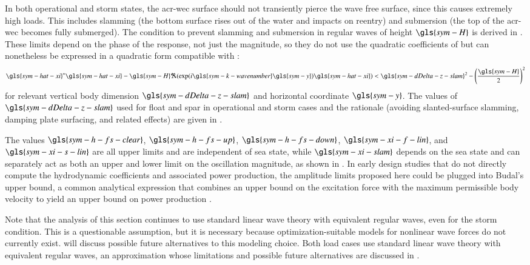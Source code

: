 In both operational and storm states, the \gls{acr-wec} surface should not transiently pierce the wave free surface, since this causes extremely high loads.
This includes slamming (the bottom surface rises out of the water and impacts on reentry) and submersion (the top of the \gls{acr-wec} becomes fully submerged).
The condition to prevent slamming and submersion in regular waves of height $\gls{sym-H}$ is derived in .
These limits depend on the phase of the response, not just the magnitude, so they do not use the quadratic coefficients of  but can nonetheless be expressed in a quadratic form compatible with :
\begin{equation}\label{eq:slam-constraint-quadratic}
    \gls{sym-hat-xi}^*\gls{sym-hat-xi} 
    - \gls{sym-H} \Re(
                    \exp (i\gls{sym-k-wavenumber}\gls{sym-y})
                    \gls{sym-hat-xi}
                    )
    < \gls{sym-dDelta-z-slam}^2
    -\left(
            \frac{\gls{sym-H}}{2}
    \right)^2
\end{equation}
for relevant vertical body dimension $\gls{sym-dDelta-z-slam}$ and horizontal coordinate $\gls{sym-y}$.
The values of $\gls{sym-dDelta-z-slam}$ used for float and spar in operational and storm cases and the rationale
(avoiding slanted-surface slamming, damping plate surfacing, and related effects)
are given in .

\ifdefined\DISSERTATION
    The values $\gls{sym-h-fs-clear}$, $\gls{sym-h-fs-up}$, $\gls{sym-h-fs-down}$,
    $\gls{sym-xi-f-lin}$, and $\gls{sym-xi-s-lin}$
    are all upper limits and are independent of sea state,
    while $\gls{sym-xi-slam}$ depends on the sea state
    and can separately act as both an upper and lower limit on the oscillation magnitude,
    as shown in .
    In early design studies that do not directly compute the hydrodynamic coefficients and associated power production,
    the amplitude limits proposed here could be plugged into Budal's upper bound,
    a common analytical expression that combines an upper bound on the excitation force with the maximum permissible body velocity
    to yield an upper bound on power production \citep{zou_practical_2023}.

    Note that the analysis of this section continues to use standard linear wave theory with equivalent regular waves,
    even for the storm condition.
    This is a questionable assumption,
    but it is necessary because optimization-suitable models for nonlinear wave forces do not currently exist.
     will discuss possible future alternatives to this modeling choice.
\else
    Both load cases use standard linear wave theory with equivalent regular waves,
    an approximation whose limitations and possible future alternatives are discussed in .
\fi

